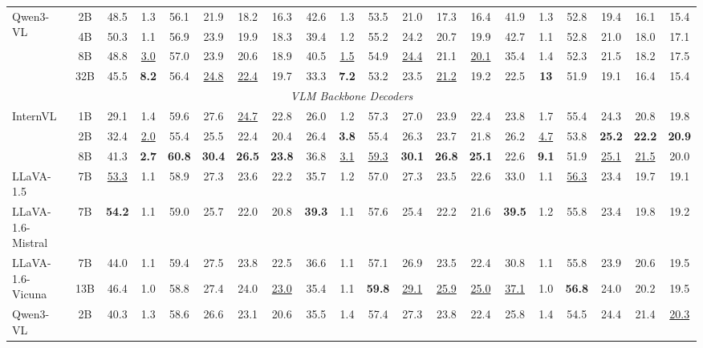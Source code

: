 \begin{table}[t]
{\begin{tabular}{lc|cccccc|cccccc|cccccc}
\multirow{4}{*}{Qwen3-VL} & 2B & 48.5 & 1.3 & 56.1 & 21.9 & 18.2 & 16.3 & 42.6 & 1.3 & 53.5 & 21.0 & 17.3 & 16.4 & 41.9 & 1.3 & 52.8 & 19.4 & 16.1 & 15.4 \\
 & 4B & 50.3 & 1.1 & 56.9 & 23.9 & 19.9 & 18.3 & 39.4 & 1.2 & 55.2 & 24.2 & 20.7 & 19.9 & 42.7 & 1.1 & 52.8 & 21.0 & 18.0 & 17.1 \\
 & 8B & 48.8 & \underline{3.0} & 57.0 & 23.9 & 20.6 & 18.9 & 40.5 & \underline{1.5} & 54.9 & \underline{24.4} & 21.1 & \underline{20.1} & 35.4 & 1.4 & 52.3 & 21.5 & 18.2 & 17.5 \\
 & 32B & 45.5 & \textbf{8.2} & 56.4 & \underline{24.8} & \underline{22.4} & 19.7 & 33.3 & \textbf{7.2} & 53.2 & 23.5 & \underline{21.2} & 19.2 & 22.5 & \textbf{13} & 51.9 & 19.1 & 16.4 & 15.4 \\
\midrule
\multicolumn{20}{c}{\textit{VLM Backbone Decoders}} \\
\midrule
\multirow{3}{*}{InternVL} & 1B & 29.1 & 1.4 & 59.6 & 27.6 & \underline{24.7} & 22.8 & 26.0 & 1.2 & 57.3 & 27.0 & 23.9 & 22.4 & 23.8 & 1.7 & 55.4 & 24.3 & 20.8 & 19.8 \\
 & 2B & 32.4 & \underline{2.0} & 55.4 & 25.5 & 22.4 & 20.4 & 26.4 & \textbf{3.8} & 55.4 & 26.3 & 23.7 & 21.8 & 26.2 & \underline{4.7} & 53.8 & \textbf{25.2} & \textbf{22.2} & \textbf{20.9} \\
 & 8B & 41.3 & \textbf{2.7} & \textbf{60.8} & \textbf{30.4} & \textbf{26.5} & \textbf{23.8} & 36.8 & \underline{3.1} & \underline{59.3} & \textbf{30.1} & \textbf{26.8} & \textbf{25.1} & 22.6 & \textbf{9.1} & 51.9 & \underline{25.1} & \underline{21.5} & 20.0 \\
LLaVA-1.5 & 7B & \underline{53.3} & 1.1 & 58.9 & 27.3 & 23.6 & 22.2 & 35.7 & 1.2 & 57.0 & 27.3 & 23.5 & 22.6 & 33.0 & 1.1 & \underline{56.3} & 23.4 & 19.7 & 19.1 \\
LLaVA-1.6-Mistral & 7B & \textbf{54.2} & 1.1 & 59.0 & 25.7 & 22.0 & 20.8 & \textbf{39.3} & 1.1 & 57.6 & 25.4 & 22.2 & 21.6 & \textbf{39.5} & 1.2 & 55.8 & 23.4 & 19.8 & 19.2 \\
\multirow{2}{*}{LLaVA-1.6-Vicuna} & 7B & 44.0 & 1.1 & 59.4 & 27.5 & 23.8 & 22.5 & 36.6 & 1.1 & 57.1 & 26.9 & 23.5 & 22.4 & 30.8 & 1.1 & 55.8 & 23.9 & 20.6 & 19.5 \\
 & 13B & 46.4 & 1.0 & 58.8 & 27.4 & 24.0 & \underline{23.0} & 35.4 & 1.1 & \textbf{59.8} & \underline{29.1} & \underline{25.9} & \underline{25.0} & \underline{37.1} & 1.0 & \textbf{56.8} & 24.0 & 20.2 & 19.5 \\
\multirow{4}{*}{Qwen3-VL} & 2B & 40.3 & 1.3 & 58.6 & 26.6 & 23.1 & 20.6 & 35.5 & 1.4 & 57.4 & 27.3 & 23.8 & 22.4 & 25.8 & 1.4 & 54.5 & 24.4 & 21.4 & \underline{20.3} \\

\end{tabular}}
\end{table}
